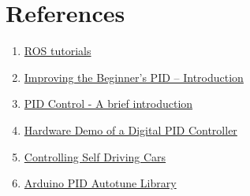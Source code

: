 \documentclass[a4paper,12pt,oneside]{book}
\begin{document}


\section{References}
    \begin{enumerate}
        \item \href{http://wiki.ros.org/ROS/Tutorials}{ROS tutorials}
        \item \href{http://brettbeauregard.com/blog/2011/04/improving-the-beginners-pid-introduction/}{Improving the Beginner’s PID – Introduction}
        \item \href{https://www.youtube.com/watch?v=UR0hOmjaHp0&list=PLUMWjy5jgHK20UW0yM2    2HYEUTMJfla7Mb}{PID Control - A brief introduction}
        \item \href{https://www.youtube.com/watch?v=fusr9eTceEo}{Hardware Demo of a Digital PID Controller}
        \item \href{https://www.youtube.com/watch?v=4Y7zG48uHRo}{Controlling Self Driving Cars}
         \item \href{http://brettbeauregard.com/blog/2012/01/arduino-pid-autotune-library/}{Arduino PID Autotune Library} 
        
    \end{enumerate}
\end{document}
